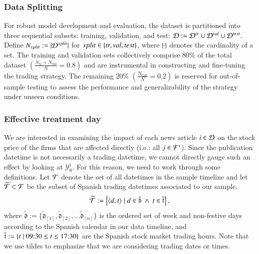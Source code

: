 \subsubsection*{Data Splitting}
For robust model development and evaluation, the dataset is partitioned into three sequential subsets: training, validation, and test:
$
\mathcal{D} := \mathcal{D}^{tr} \cup \mathcal{D}^{val} \cup \mathcal{D}^{test}.
$
Define $N_{split}:=|\mathcal{D}^{split}|$ for $split\in\left\{tr,val,test\right\}$, where $\left|\cdot\right|$ denotes the cardinality of a set. 
The training and validation sets collectively comprise 80\% of the total dataset $(\frac{N_{\text{tr}} + N_{\text{val}}}{N} = 0.8)$ and are instrumental in constructing and fine-tuning the trading strategy. The remaining 20\% $(\frac{N_{\text{test}}}{N} = 0.2)$ is reserved for out-of-sample testing to assess the performance and generalizability of the strategy under unseen conditions.

\subsubsection*{Effective treatment day}
We are interested in examining the impact of each news article $i\in\mathcal{D}$ on the stock price of the firms that are affected directly (i.e.: all $j\in\mathcal{F}^i$). Since the publication datetime is not necessarily a trading datetime, we cannot directly gauge such an effect by looking at $\mathcal Y_0^i$. 
For this reason, we need to work through some definitions. 
%
%
Let $\mathcal{T}$ denote the set of all datetimes in the sample timeline and let $\widetilde{\mathcal{T}}\subset \mathcal{T}$ be the subset of Spanish trading datetimes associated to our sample.
\begin{align*}
\widetilde{\mathcal{T}} := 
\left\{\langle d,t \rangle \mid d \in \tilde{\mathfrak d} ~\wedge~ t\in \tilde{\mathfrak t}\right\}
,
\end{align*}
where 
$
\tilde{\mathfrak{d}}:=\{\tilde{\mathfrak{d}}_{[1]},\tilde{\mathfrak{d}}_{[2]}, \ldots \tilde{\mathfrak{d}}_{[n]}\}
$
is the ordered set of week and non-festive days according to the Spanish calendar in our data timeline,
and 
$\tilde{\mathfrak t}:=
\{t \mid \text{09:30} \leq t \leq  \text{17:30}\}
$
 are the Spanish stock market trading hours. 
Note that we use tildes to emphasize that we are considering trading dates or times. 

